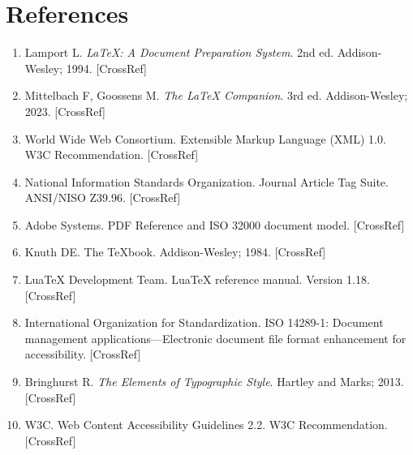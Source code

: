 \documentclass{tnqjournal}
\newcommand{\crossref}{\textcolor{urpred}{[CrossRef]}}
\begin{document}
\section{References}
\begin{enumerate}[leftmargin=13pt,itemsep=2pt,label={}]
  \item Lamport L. \textit{LaTeX: A Document Preparation System}. 2nd ed. Addison-Wesley; 1994. \crossref
  \item Mittelbach F, Goossens M. \textit{The LaTeX Companion}. 3rd ed. Addison-Wesley; 2023. \crossref
  \item World Wide Web Consortium. Extensible Markup Language (XML) 1.0. W3C Recommendation. \crossref
  \item National Information Standards Organization. Journal Article Tag Suite. ANSI/NISO Z39.96. \crossref
  \item Adobe Systems. PDF Reference and ISO 32000 document model. \crossref
  \item Knuth DE. The \TeX book. Addison-Wesley; 1984. \crossref
  \item LuaTeX Development Team. LuaTeX reference manual. Version 1.18. \crossref
  \item International Organization for Standardization. ISO 14289-1: Document management applications---Electronic document file format enhancement for accessibility. \crossref
  \item Bringhurst R. \textit{The Elements of Typographic Style}. Hartley and Marks; 2013. \crossref
  \item W3C. Web Content Accessibility Guidelines 2.2. W3C Recommendation. \crossref
\end{enumerate}
\end{document}
